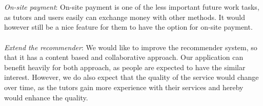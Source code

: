 \\\\
\textit{On-site payment}:
On-site payment is one of the less important future work tasks, as tutors and users easily can exchange money with other methods.
It would however still be a nice feature for them to have the option for on-site payment.
\\\\
\textit{Extend the recommender}:
We would like to improve the recommender system, so that it has a content based and collaborative approach.
Our application can benefit heavily for both approach, as people are expected to have the similar interest. 
However, we do also expect that the quality of the service would change over time, as the tutors gain more experience with their services and hereby would enhance the quality.